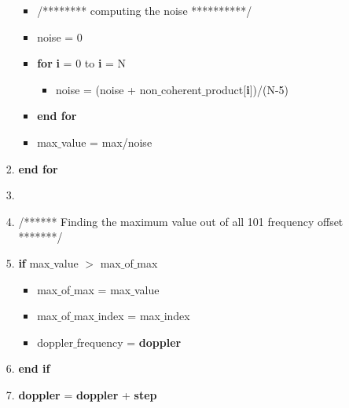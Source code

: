 \documentclass[journal,10pt,onecolumn]{article}
\begin{document}
\begin{itemize}
\begin{enumerate}
\begin{enumerate}
\begin{itemize}
            \item[] /******** computing the noise **********/
            \item[] noise = 0
            \item[] \textbf{for} \textbf{i} = 0 to \textbf{i} = N
            \begin{itemize}
               \item[] noise = (noise + non$\_$coherent$\_$product[\textbf{i}])/(N-5)
            \end{itemize}
            \item[] \textbf{end for}
            \item[] max$\_$value = max/noise
            







        \end{itemize}
        \item[] \textbf{end for}
    \item[] 
    \item[] /****** Finding the maximum value out of all 101 frequency offset *******/
    \item[] \textbf{if}  max$\_$value $>$ max$\_$of$\_$max
    \begin{itemize}
        \item[] max$\_$of$\_$max = max$\_$value
        \item[] max$\_$of$\_$max$\_$index = max$\_$index
        \item[] doppler$\_$frequency = \textbf{doppler}
    \end{itemize}
    \item[] \textbf{end if}
    \item[] \textbf{doppler} = \textbf{doppler} + \textbf{step}


\end{enumerate}
\end{enumerate}
\end{itemize}
\end{document}
